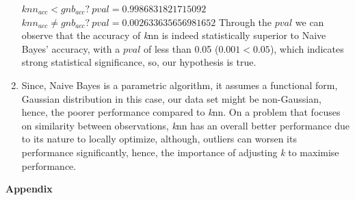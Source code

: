 \documentclass[12pt]{article}
\begin{document}
\begin{enumerate}[leftmargin=\labelsep,resume]
$knn_{acc}<gnb_{acc}? \ pval= 0.9986831821715092 $\\
$knn_{acc} \neq gnb_{acc}? \ pval= 0.002633635656981652 $
\newline
\newline
Through the $pval$ we can observe that the accuracy of \textit{k}nn is indeed statistically superior to Naive Bayes' accuracy, with a $pval$ of less than 0.05 ($0.001 < 0.05$), which indicates strong statistical significance, so, our hypothesis is true. 
\item
Since, Naive Bayes is a parametric algorithm, it assumes a functional form, Gaussian distribution in this case, our data set might be non-Gaussian, hence, the poorer performance compared to \textit{k}nn. On a problem that focuses on similarity between observations, \textit{k}nn has an overall better performance due to its nature to locally optimize, although, outliers can worsen its performance significantly, hence, the importance of adjusting \textit{k} to maximise performance.
\end{enumerate}
\newpage
\center\large{\textbf{Appendix}\vskip 0.3cm}
\end{document}
